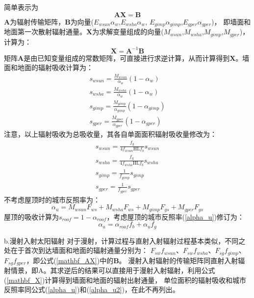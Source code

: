 简单表示为
\begin{equation}\label{mathbf_AX}
\mathbf{A X}=\mathbf{B}
\end{equation}
$\mathbf{A}$为辐射传输矩阵，$\mathbf{B}$为向量($E_{wsun}\alpha_w$,$E_{wsha}\alpha_w$,
$E_{gimp}\alpha_{gimp}$,$E_{gper}\alpha_{gper}$)，
即墙面和地面第一次散射辐射通量。$\mathbf{X}$为求解变量组成的向量($M_{wsun}$,$M_{wsha}$,$M_{gimp}$,$M_{gper}$)，
计算为：
\begin{equation}\label{mathbf_X}
\mathbf{X}=\mathbf{A}^{-1} \mathbf{B}
\end{equation}
矩阵$\mathbf{A}$是由已知变量组成的常数矩阵，可直接进行求逆计算，从而计算得到$\mathbf{X}$。墙面和地面的辐射吸收计算为：
\begin{equation}\label{s_wsun_wsha_gimp_gper_1}
\begin{array}{c}s_{wsun}=\frac{M_{wsun}}{\alpha_{w}}\left(1-\alpha_{w}\right) \\ 
    s_{wsha}=\frac{M_{wsha}}{\alpha_{w}}\left(1-\alpha_{w}\right) \\
    s_{gimp}=\frac{M_{gimp}}{\alpha_{gimp}}\left(1-\alpha_{gimp}\right) \\
    s_{gper}=\frac{M_{gper}}{\alpha_{gper}}\left(1-\alpha_{gper}\right)\end{array}
\end{equation}
注意，以上辐射吸收为总吸收量，其各自单面面积辐射吸收量修改为：
\begin{equation}\label{s_wsun_wsha_gimp_gper_2}
\begin{array}{c}s_{wsun}=\frac{f_{g}}{4 f_{wsun} \mathrm{HL} f_{b}} s_{wsun} \\ 
    s_{wsha}=\frac{f_{g}}{4 f_{wsha} \mathrm{HL} f_{b}} s_{wsha} \\ 
    s_{gimp}=\frac{1}{f_{gimp}} s_{gimp} \\ 
    s_{gper}=\frac{1}{f_{gper}} s_{gper}\end{array}
\end{equation}
不考虑屋顶时的城市反照率为：
\begin{equation}\label{alpha_u}
\alpha_{u}=M_{wsun} F_{ws}+M_{wsha} F_{ws}+M_{gimp} F_{gs}+M_{gper} F_{gs}
\end{equation}
屋顶的吸收计算为$s_{roof}=1-\alpha_{roof}$，考虑屋顶的城市反照率(\ref{alpha_u})修订为：
\begin{equation}\label{alpha_u2}
\alpha_{u}=\alpha_{{roof }} f_{b}+\alpha_{u} f_{g}
\end{equation}

b.漫射入射太阳辐射
对于漫射，计算过程与直射入射辐射过程基本类似，不同之处在于首次到达墙面和地面的辐射通量分别为：
$F_{sw}f_{wsun}$、$F_{sw}f_{wsha}$、$F_{sg}f_{gimp}$、$F_{sg}f_{gper}$，即公式(\ref{mathbf_AX})中的$\mathbf{B}$。
漫射入射辐射的传输矩阵同直射入射辐射情景，即A。其求逆后的结果可以直接用于漫射入射辐射，利用公式(\ref{mathbf_X})计算得到墙面和地面的辐射出射通量，
单位面积的辐射吸收和城市反照率同公式(\ref{alpha_u})和(\ref{alpha_u2})，在此不再列出。

